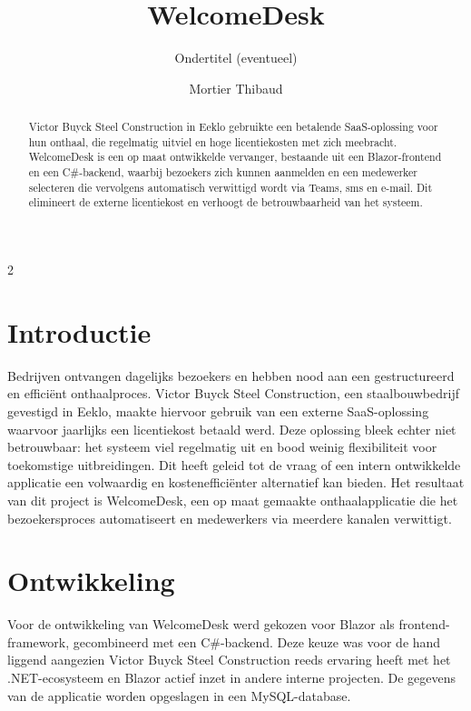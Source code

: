 \documentclass[a0,portrait]{hogent-poster}
\title{WelcomeDesk}
\subtitle{Ondertitel (eventueel)}
\author{Mortier Thibaud}
\begin{document}
\maketitle

\begin{abstract}
Victor Buyck Steel Construction in Eeklo gebruikte een betalende SaaS-oplossing voor hun onthaal, die regelmatig uitviel en hoge licentiekosten met zich meebracht. WelcomeDesk is een op maat ontwikkelde vervanger, bestaande uit een Blazor-frontend en een C\#-backend, waarbij bezoekers zich kunnen aanmelden en een medewerker selecteren die vervolgens automatisch verwittigd wordt via Teams, sms en e-mail. Dit elimineert de externe licentiekost en verhoogt de betrouwbaarheid van het systeem.
\end{abstract}

\begin{multicols}{2} %

\section{Introductie}

Bedrijven ontvangen dagelijks bezoekers en hebben nood aan een gestructureerd en efficiënt onthaalproces. Victor Buyck Steel Construction, een staalbouwbedrijf gevestigd in Eeklo, maakte hiervoor gebruik van een externe SaaS-oplossing waarvoor jaarlijks een licentiekost betaald werd. Deze oplossing bleek echter niet betrouwbaar: het systeem viel regelmatig uit en bood weinig flexibiliteit voor toekomstige uitbreidingen.
Dit heeft geleid tot de vraag of een intern ontwikkelde applicatie een volwaardig en kostenefficiënter alternatief kan bieden. Het resultaat van dit project is WelcomeDesk, een op maat gemaakte onthaalapplicatie die het bezoekersproces automatiseert en medewerkers via meerdere kanalen verwittigt.


\section{Ontwikkeling}

Voor de ontwikkeling van WelcomeDesk werd gekozen voor Blazor als frontend-framework, gecombineerd met een C\#-backend. Deze keuze was voor de hand liggend aangezien Victor Buyck Steel Construction reeds ervaring heeft met het .NET-ecosysteem en Blazor actief inzet in andere interne projecten. De gegevens van de applicatie worden opgeslagen in een MySQL-database.


\end{multicols}
\end{document}
